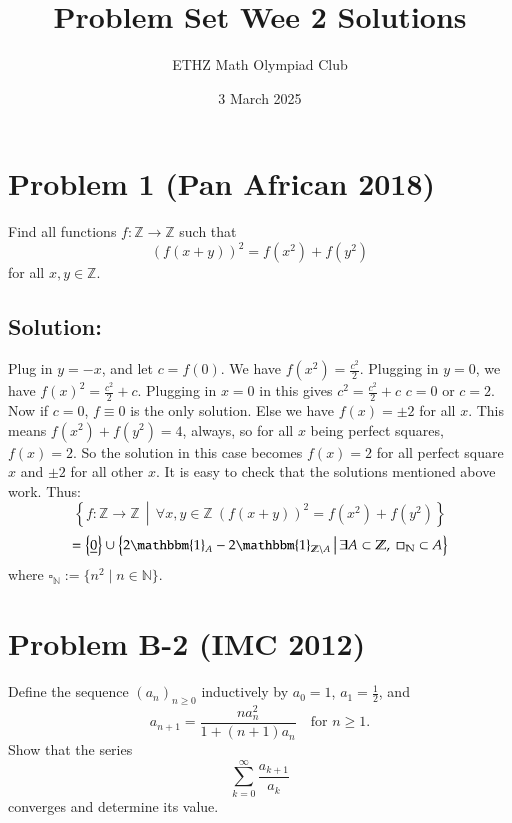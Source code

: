 \documentclass[11pt, a4paper, oneside]{article}
\title{Problem Set Wee 2 Solutions}
\author{ETHZ Math Olympiad Club}
\date{3 March 2025}
\newcommand{\problem}[1][]{\section{#1} \hfill \par}
\newcommand{\solution}[1][]{\subsection*{#1}\hfill \par}
\theoremstyle{remark}
\theoremstyle{lemma}
\begin{document}
\maketitle
\problem[Problem 1 (Pan African 2018)]
Find all functions $f : \mathbb Z \to \mathbb Z$ such that $$(f(x + y))^2 = f(x^2) + f(y^2)$$ for all $x, y \in \mathbb Z$.
\solution[Solution:]
Plug in $y=-x$, and let $c=f(0)$. We have $f(x^2) = \frac{c^2}{2}$. Plugging in $y=0$, we have $f(x)^2 = \frac{c^2}{2} + c$. Plugging in $x=0$ in this gives $c^2=\frac{c^2}{2}+c$ $c=0$ or $c=2$. Now if $c=0$, $f \equiv 0$ is the only solution. Else we have $f(x) = \pm 2$ for all $x$. This means $f(x^2) + f(y^2) = 4$, always, so for all $x$ being perfect squares, $f(x)=2$. So the solution in this case becomes $f(x) = 2$ for all perfect square $x$ and $\pm 2$ for all other $x$.
It is easy to check that the solutions mentioned above work. Thus:
\[
\left\{ f : \mathbb{Z} \to \mathbb{Z} \,\middle|\, \forall x,y \in \mathbb{Z} \ (f(x + y))^2 = f(x^2) + f(y^2) \right\}
\]
\[
=
\left\{ \underline{0} \right\} \cup \left\{ 2\mathbbm{1}_{A} - 2\mathbbm{1}_{\mathbb{Z} \setminus A} \,\middle|\, \exists A \subset \mathbb{Z}, \ \square_{\mathbb{N}} \subset A \right\}
\]
where \(\square_{\mathbb{N}} := \{ n^2 \mid n \in \mathbb{N} \}\).

\newpage
\problem[Problem B-2 (IMC 2012)]
Define the sequence \( (a_n)_{n \geq 0} \) inductively by \( a_0 = 1 \), \( a_1 = \frac{1}{2} \), and  
\[
a_{n+1} = \frac{n a_n^2}{1 + (n+1)a_n} \quad \text{for } n \geq 1.
\]
Show that the series  
\[
\sum_{k=0}^{\infty} \frac{a_{k+1}}{a_k}
\]
converges and determine its value.
\end{document}
